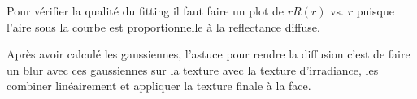\documentclass[12pt,a4paper]{article}
\begin{document}
Pour vérifier la qualité du fitting il faut faire un plot de $rR(r)$ vs. $r$ puisque l'aire sous la courbe est proportionnelle à la reflectance diffuse. 

Après avoir calculé les gaussiennes, l'astuce pour rendre la diffusion c'est de faire un blur avec ces gaussiennes sur la texture avec la texture d'irradiance, les combiner linéairement et appliquer la texture finale à la face.
\end{document}
